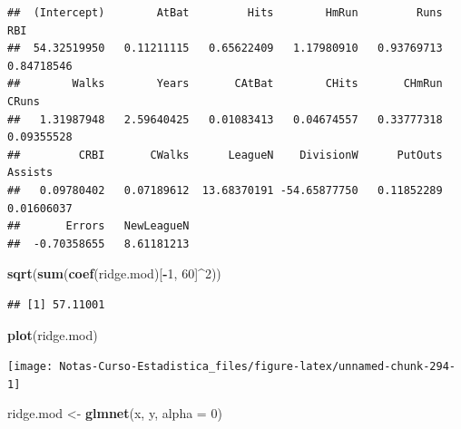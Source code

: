 \documentclass[
  12pt,
]{book}
\newenvironment{Shaded}{\begin{snugshade}}{\end{snugshade}}
\newcommand{\DataTypeTok}[1]{\textcolor[rgb]{0.13,0.29,0.53}{#1}}
\newcommand{\DecValTok}[1]{\textcolor[rgb]{0.00,0.00,0.81}{#1}}
\newcommand{\KeywordTok}[1]{\textcolor[rgb]{0.13,0.29,0.53}{\textbf{#1}}}
\newcommand{\NormalTok}[1]{#1}
\newcommand{\OperatorTok}[1]{\textcolor[rgb]{0.81,0.36,0.00}{\textbf{#1}}}
\newcommand{\StringTok}[1]{\textcolor[rgb]{0.31,0.60,0.02}{#1}}
\theoremstyle{definition}
\theoremstyle{definition}
\theoremstyle{definition}
\theoremstyle{remark}
\begin{document}
\begin{verbatim}
##  (Intercept)        AtBat         Hits        HmRun         Runs          RBI 
##  54.32519950   0.11211115   0.65622409   1.17980910   0.93769713   0.84718546 
##        Walks        Years       CAtBat        CHits       CHmRun        CRuns 
##   1.31987948   2.59640425   0.01083413   0.04674557   0.33777318   0.09355528 
##         CRBI       CWalks      LeagueN    DivisionW      PutOuts      Assists 
##   0.09780402   0.07189612  13.68370191 -54.65877750   0.11852289   0.01606037 
##       Errors   NewLeagueN 
##  -0.70358655   8.61181213
\end{verbatim}

\begin{Shaded}
\begin{Highlighting}[]
\KeywordTok{sqrt}\NormalTok{(}\KeywordTok{sum}\NormalTok{(}\KeywordTok{coef}\NormalTok{(ridge.mod)[}\OperatorTok{-}\DecValTok{1}\NormalTok{, }\DecValTok{60}\NormalTok{]}\OperatorTok{^}\DecValTok{2}\NormalTok{))}
\end{Highlighting}
\end{Shaded}

\begin{verbatim}
## [1] 57.11001
\end{verbatim}

\begin{Shaded}
\begin{Highlighting}[]
\KeywordTok{plot}\NormalTok{(ridge.mod)}
\end{Highlighting}
\end{Shaded}

\begin{center}\texttt{[image: Notas-Curso-Estadistica\_files/figure-latex/unnamed-chunk-294-1]} \end{center}

\begin{Shaded}
\begin{Highlighting}[]
\NormalTok{ridge.mod <-}\StringTok{ }\KeywordTok{glmnet}\NormalTok{(x, y, }\DataTypeTok{alpha =} \DecValTok{0}\NormalTok{)}
\end{Highlighting}
\end{Shaded}

\begin{Shaded}
\end{Shaded}
\end{document}
